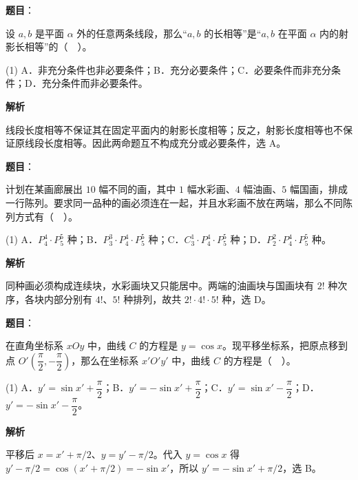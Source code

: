 \begin{answer}

\textbf{题目}：

设 $a,b$ 是平面 $\alpha$ 外的任意两条线段，那么“$a,b$ 的长相等”是“$a,b$ 在平面 $\alpha$ 内的射影长相等”的（　）。

\begin{gkopts}(1)
\task A．非充分条件也非必要条件；B．充分必要条件；C．必要条件而非充分条件；D．充分条件而非必要条件。
\end{gkopts}

\textbf{解析}

线段长度相等不保证其在固定平面内的射影长度相等；反之，射影长度相等也不保证原线段长度相等。因此两命题互不构成充分或必要条件，选 A。


\end{answer}
\begin{answer}

\textbf{题目}：

计划在某画廊展出 $10$ 幅不同的画，其中 $1$ 幅水彩画、$4$ 幅油画、$5$ 幅国画，排成一行陈列。要求同一品种的画必须连在一起，并且水彩画不放在两端，那么不同陈列方式有（　）。

\begin{gkopts}(1)
\task A．$P_4^4\cdot P_5^5$ 种；B．$P_3^3\cdot P_4^4\cdot P_5^5$ 种；C．$C_3^1\cdot P_4^4\cdot P_5^5$ 种；D．$P_2^2\cdot P_4^4\cdot P_5^5$ 种。
\end{gkopts}

\textbf{解析}

同种画必须构成连续块，水彩画块又只能居中。两端的油画块与国画块有 $2!$ 种次序，各块内部分别有 $4!$、$5!$ 种排列，故共 $2!\cdot4!\cdot5!$ 种，选 D。


\end{answer}
\begin{answer}

\textbf{题目}：

在直角坐标系 $xOy$ 中，曲线 $C$ 的方程是 $y=\cos x$。现平移坐标系，把原点移到点 $O'\left(\dfrac\pi2,-\dfrac\pi2\right)$，那么在坐标系 $x'O'y'$ 中，曲线 $C$ 的方程是（　）。

\begin{gkopts}(1)
\task A．$y'=\sin x'+\dfrac\pi2$；B．$y'=-\sin x'+\dfrac\pi2$；C．$y'=\sin x'-\dfrac\pi2$；D．$y'=-\sin x'-\dfrac\pi2$。
\end{gkopts}

\textbf{解析}

平移后 $x=x'+\pi/2$、$y=y'-\pi/2$。代入 $y=\cos x$ 得 $y'-\pi/2=\cos(x'+\pi/2)=-\sin x'$，所以 $y'=-\sin x'+\pi/2$，选 B。


\end{answer}
